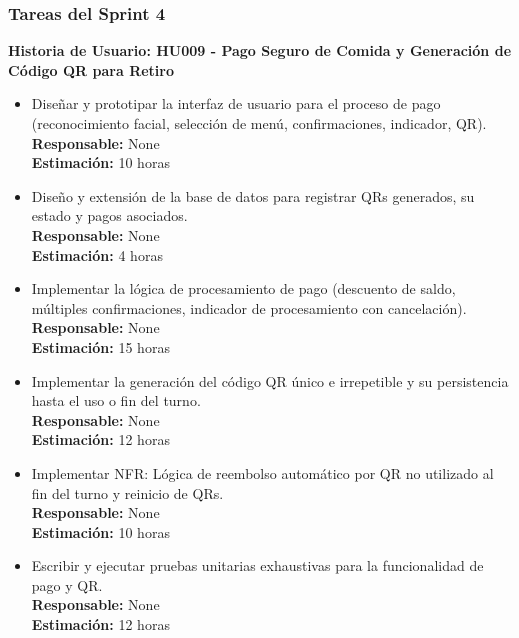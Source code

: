 \documentclass[12pt]{article}
\begin{document}
\subsubsection{Tareas del Sprint 4}
\textbf{Historia de Usuario: HU009 - Pago Seguro de Comida y Generación de Código QR para Retiro}
\begin{itemize}
	\item Diseñar y prototipar la interfaz de usuario para el proceso de pago (reconocimiento facial, selección de menú, confirmaciones, indicador, QR). \\
	\textbf{Responsable:} None \\
	\textbf{Estimación:} 10 horas
	\item Diseño y extensión de la base de datos para registrar QRs generados, su estado y pagos asociados. \\
	\textbf{Responsable:} None \\
	\textbf{Estimación:} 4 horas
	\item Implementar la lógica de procesamiento de pago (descuento de saldo, múltiples confirmaciones, indicador de procesamiento con cancelación). \\
	\textbf{Responsable:} None \\
	\textbf{Estimación:} 15 horas
	\item Implementar la generación del código QR único e irrepetible y su persistencia hasta el uso o fin del turno. \\
	\textbf{Responsable:} None \\
	\textbf{Estimación:} 12 horas
	\item Implementar NFR: Lógica de reembolso automático por QR no utilizado al fin del turno y reinicio de QRs. \\
	\textbf{Responsable:} None \\
	\textbf{Estimación:} 10 horas
	\item Escribir y ejecutar pruebas unitarias exhaustivas para la funcionalidad de pago y QR. \\
	\textbf{Responsable:} None \\
	\textbf{Estimación:} 12 horas
\end{itemize}
\end{document}
